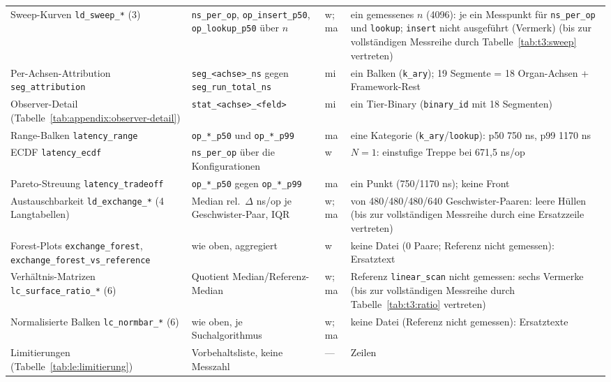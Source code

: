 \begin{footnotesize}
\begin{longtable}{@{}>{\raggedright\arraybackslash}p{4.6cm}>{\raggedright\arraybackslash}p{3.4cm}>{\raggedright\arraybackslash}p{1.1cm}>{\raggedright\arraybackslash}p{5.3cm}@{}}
Sweep-Kurven \texttt{ld\_\allowbreak{}sweep\_*} (3) & \texttt{ns\_per\_op}, \texttt{op\_insert\_p50},
  \texttt{op\_lookup\_p50} über $n$ & w; ma & ein gemessenes $n$ (4096): je ein Messpunkt für \texttt{ns\_per\_op} und
  \texttt{lookup}; \texttt{insert} nicht ausgeführt (Vermerk)
  \ifPlatzhalterAlsTabelle{}(bis zur vollständigen Messreihe durch
  Tabelle~\ref{tab:t3:sweep} vertreten)\fi \\
Per-Achsen-Attribution \texttt{seg\_\allowbreak{}attribution} & \texttt{seg\_\allowbreak{}<achse>\_\allowbreak{}ns} gegen \texttt{seg\_\allowbreak{}run\_\allowbreak{}total\_\allowbreak{}ns} & mi & ein Balken (\texttt{k\_ary}); 19 Segmente = 18 Organ-Achsen + Framework-Rest \\
Observer-Detail (Tabelle~\ref{tab:appendix:observer-detail}) & \texttt{stat\_\allowbreak{}<achse>\_\allowbreak{}<feld>} & mi & ein Tier-Binary (\texttt{binary\_id} mit 18 Segmenten) \\
Range-Balken \texttt{latency\_\allowbreak{}range} & \texttt{op\_*\_p50} und \texttt{op\_*\_p99} & ma & eine Kategorie (\texttt{k\_ary}/\texttt{lookup}): p50 750 ns, p99 1170 ns \\
ECDF \texttt{latency\_\allowbreak{}ecdf} & \texttt{ns\_per\_op} über die Konfigurationen & w & $N = 1$: einstufige Treppe bei 671,5 ns/op \\
Pareto-Streuung \texttt{latency\_\allowbreak{}tradeoff} & \texttt{op\_*\_p50} gegen \texttt{op\_*\_p99} & ma & ein Punkt (750/1170 ns); keine Front \\
Austauschbarkeit \texttt{ld\_\allowbreak{}exchange\_*} (4 Langtabellen) & Median rel.\ $\Delta$ ns/op je
  Geschwister-Paar, IQR & w; ma & 0 von 480/480/480/640 Geschwister-Paaren: leere Hüllen
  \ifPlatzhalterAlsTabelle{}(bis zur vollständigen Messreihe durch
  eine Ersatzzeile vertreten)\fi \\
Forest-Plots \texttt{exchange\_\allowbreak{}forest}, \texttt{exchange\_\allowbreak{}forest\_\allowbreak{}vs\_\allowbreak{}reference} & wie oben, aggregiert & w & keine Datei (0 Paare; Referenz nicht gemessen): Ersatztext \\
Verhältnis-Matrizen \texttt{lc\_\allowbreak{}surface\_\allowbreak{}ratio\_*} (6) & Quotient Median/Referenz-Median &
  w; ma & Referenz \texttt{linear\_scan} nicht gemessen: sechs Vermerke
  \ifPlatzhalterAlsTabelle{}(bis zur vollständigen Messreihe durch
  Tabelle~\ref{tab:t3:ratio} vertreten)\fi \\
Normalisierte Balken \texttt{lc\_\allowbreak{}normbar\_*} (6) & wie oben, je Suchalgorithmus & w; ma & keine Datei (Referenz nicht gemessen): Ersatztexte \\
Limitierungen (Tabelle~\ref{tab:le:limitierung}) & Vorbehaltsliste, keine Messzahl & --- & 16 Zeilen \\
\end{longtable}
\end{footnotesize}

